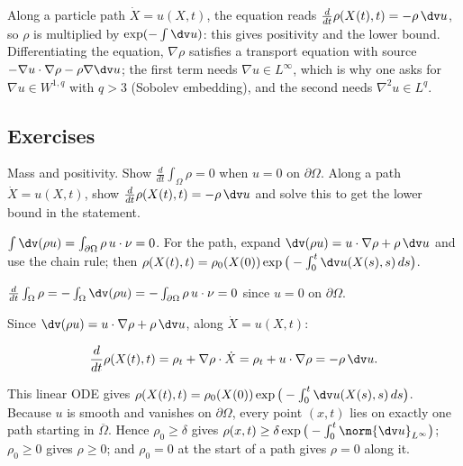 Along a particle path $\dot X = u(X,t)$, the equation reads $\frac{d}{dt}\rho(X(t),t) = -\rho\,\dv u$, so $\rho$ is multiplied by $\exp(-\int\dv u)$: this gives positivity and the lower bound. Differentiating the equation, $\nabla\rho$ satisfies a transport equation with source $-\nabla u\cdot\nabla\rho - \rho\nabla\dv u$; the first term needs $\nabla u\in L^\infty$, which is why one asks for $\nabla u\in W^{1,q}$ with $q> 3$ (Sobolev embedding), and the second needs $\nabla^2 u\in L^q$.

\subsection*{Exercises}

\begin{exercise}
  Mass and positivity. Show $\frac{d}{dt}\int_\Omega\rho = 0$ when $u = 0$ on $\partial\Omega$. Along a path $\dot X = u(X,t)$, show $\frac{d}{dt}\rho(X(t),t) = -\rho\,\dv u$ and solve this to get the lower bound in the statement.
  \begin{hint}
    $\int\dv(\rho u) = \int_{\partial\Omega}\rho\,u\cdot\nu = 0$. For the path, expand $\dv(\rho u) = u\cdot\nabla\rho + \rho\,\dv u$ and use the chain rule; then $\rho(X(t),t) = \rho_0(X(0))\exp\big(-\int_0^t \dv u(X(s),s)\,ds\big)$.
  \end{hint}
  \begin{solution}
    $\frac{d}{dt}\int_\Omega\rho = -\int_\Omega\dv(\rho u) = -\int_{\partial\Omega}\rho\,u\cdot\nu = 0$ since $u = 0$ on $\partial\Omega$.

    Since $\dv(\rho u) = u\cdot\nabla\rho + \rho\,\dv u$, along $\dot X = u(X,t)$:

    \[ \frac{d}{dt}\rho(X(t),t) = \rho_t + \nabla\rho\cdot\dot X = \rho_t + u\cdot\nabla\rho = -\rho\,\dv u. \]

    This linear ODE gives $\rho(X(t),t) = \rho_0(X(0))\exp\big(-\int_0^t\dv u(X(s),s)\,ds\big)$. Because $u$ is smooth and vanishes on $\partial\Omega$, every point $(x,t)$ lies on exactly one path starting in $\overline\Omega$. Hence $\rho_0 \ge \delta$ gives $\rho(x,t) \ge \delta\exp\big(-\int_0^t\norm{\dv u}_{L^\infty}\big)$; $\rho_0 \ge 0$ gives $\rho \ge 0$; and $\rho_0 = 0$ at the start of a path gives $\rho = 0$ along it.
  \end{solution}
\end{exercise}

